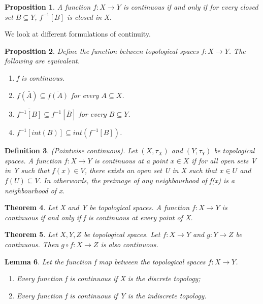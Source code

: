 \documentclass[twoside]{article}
\newcounter{lecnum}
\newtheorem{theorem}{Theorem}[lecnum]
\newtheorem{lemma}[theorem]{Lemma}
\newtheorem{proposition}[theorem]{Proposition}
\newtheorem{definition}[theorem]{Definition}
\begin{document}
\begin{proposition} A function $f: X \rightarrow Y$ is continuous if and only if for every closed set $B \subseteq Y$, $f^{-1}[B]$ is closed in X.
\end{proposition}

We look at different formulations of continuity.

\begin{proposition}Define the function between topological spaces $f: X \rightarrow Y$. The following are equivalent.
\begin{enumerate}
\item f is continuous.
\item $f(\bar{A}) \subseteq \overline{f(A)}$ for every $A \subseteq X$.
\item $\overline{f^{-1}[B]} \subseteq f^{-1}[\bar{B}]$ for every $B \subseteq Y$.
\item $f^{-1}[int(B)] \subseteq int(f^{-1}[B])$.
\end{enumerate}
\end{proposition}

\begin{definition}(Pointwise continuous). Let $(X, \tau_X)$ and $(Y, \tau_Y)$ be topological spaces. A function $f: X \rightarrow Y$ is continuous at a point $x \in X$ if for all open sets V in Y such that $f(x) \in V$, there exists an open set U in X such that $x \in U$ and $f(U) \subseteq V$. In otherwords, the preimage of any neighbourhood of f(x) is a neighbourhood of x.
\end{definition}

\begin{theorem}Let X and Y be topological spaces. A function $f: X \rightarrow Y$ is continuous if and only if f is continuous at every point of X.
\end{theorem}

\begin{theorem}Let $X, Y, Z$ be topological spaces. Let $f: X \rightarrow Y$ and $g: Y \rightarrow Z$ be continuous. Then $g \circ f: X \rightarrow Z$ is also continuous.
\end{theorem}

\begin{lemma} Let the function f map between the topological spaces $f: X \rightarrow Y$.
\begin{enumerate}
\item Every function f is continuous if X is the discrete topology;
\item Every function f is continuous if Y is the indiscrete topology.
\end{enumerate}
\end{lemma}
\end{document}
